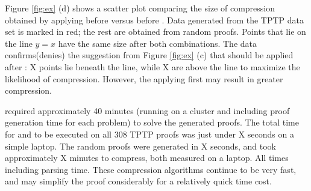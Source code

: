 {Figure \ref{fig:ex} (d) shows a scatter plot comparing the size of compression obtained by applying {\FORPI} before {\GFOLU} versus {\GFOLU} before {\FORPI}. Data generated from the TPTP data set is marked in red; the rest are obtained from random proofs. Points that lie on the line $y=x$ have the same size after both combinations. The data confirms(denies) the suggestion from Figure \ref{fig:ex} (c) that {\FORPI} should be applied after {\GFOLU}: X points lie beneath the line, while X are above the line to maximize the likelihood of compression. However, the applying {\FORPI} first may result in greater compression.

{\SPASS} required approximately 40 minutes (running on a cluster and including proof generation time for each problem) to solve the generated proofs. The total time for {\GFOLU} and {\FORPI} to be executed on all 308 TPTP proofs was just under X seconds on a simple laptop. The random proofs were generated in X seconds, and took approximately X minutes to compress, both measured on a laptop.
All times including parsing time. These compression algorithms continue to be very fast, and may simplify the proof considerably for a relatively quick time cost.







}
